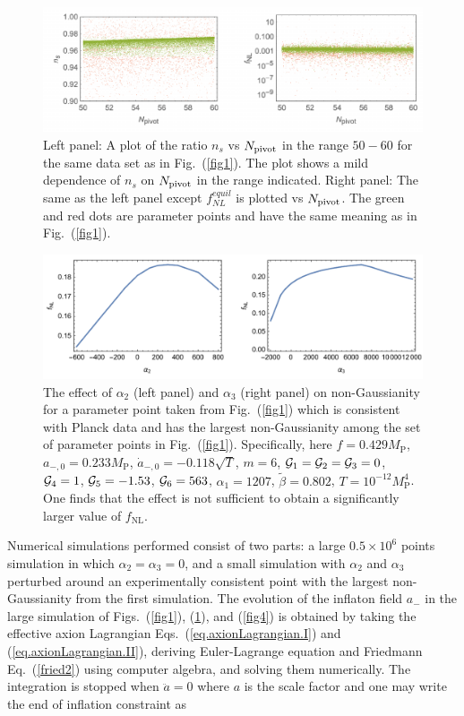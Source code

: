 \documentclass[a4paper,11pt]{article}
\begin{document}
  \begin{figure}
    \centering
    \includegraphics[width=1.0\textwidth]{figs/fig2.pdf}
    \caption{Left panel: A plot of the ratio $n_s$ vs $N_{\rm pivot}$ in the range $50-60$ for the same data set as in Fig.~(\ref{fig1}).
    The plot shows a mild dependence of $n_s$ on $N_{\rm pivot}$ in the range indicated. Right panel: The same as the left panel except
    $f^{equil}_{NL}$ is plotted vs $N_{\rm pivot}$.
    The green and red dots are parameter points and have the same meaning as in Fig.~(\ref{fig1}).}
    \label{fig2}
  \end{figure}

  \begin{figure}
  	\centering
  	\includegraphics[width=1.0\textwidth]{figs/fig3.pdf}
  	\caption{The effect of $\alpha_2$ (left panel) and $\alpha_3$ (right panel) on non-Gaussianity for a parameter point 
	taken from Fig.~(\ref{fig1}) which is consistent with 
	Planck data and has the  largest non-Gaussianity among the set of parameter points 
in Fig.~(\ref{fig1}). Specifically, here $f = 0.429 M_\text{P}$, $a_{-, 0} = 0.233 M_\text{P}$, $\dot a_{-, 0} = -0.118 \sqrt{T}$, $m = 6$, ${\cal{G}}_1 = {\cal{G}}_2 = {\cal{G}}_3 = 0$, ${\cal{G}}_4 = 1$, ${\cal{G}}_5 = -1.53$, ${\cal{G}}_6 = 563$, $\alpha_1 = 1207$, $\tilde \beta = 0.802$, $T = 10^{-12} M_\text{P}^4$. One
	finds that
	 the effect is not sufficient to obtain a significantly larger value of $f_\text{NL}$.}
  	\label{fig3}
  \end{figure}

Numerical simulations performed consist of two parts: a large $0.5 \times 10^6$ points simulation in which $\alpha_2 = \alpha_3 = 0$, and a small simulation with $\alpha_2$ and $\alpha_3$ perturbed around an experimentally consistent point with the largest non-Gaussianity from the first simulation.
  The evolution of the inflaton field $a_-$ in the large simulation of Figs.~(\ref{fig1}), (\ref{fig2}), and (\ref{fig4}) is obtained by taking the effective axion Lagrangian Eqs.~(\ref{eq.axionLagrangian.I}) and (\ref{eq.axionLagrangian.II}), deriving Euler-Lagrange equation and Friedmann Eq.~(\ref{fried2}) using computer algebra, and solving them numerically. The integration is stopped when $\ddot{a} = 0$ where $a$ is the scale factor
  and one may write the end of inflation constraint as 
\end{document}
